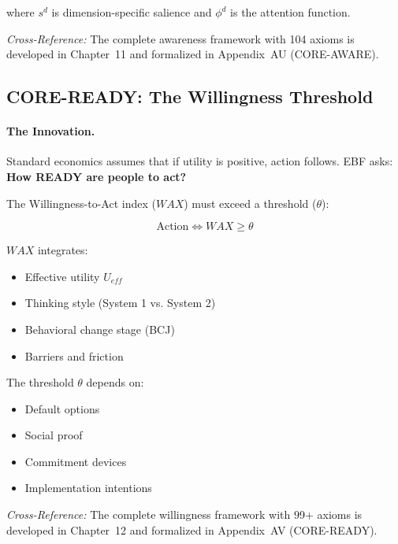 where $s^d$ is dimension-specific salience and $\phi^d$ is the attention function.

\textit{Cross-Reference:} The complete awareness framework with 104 axioms is
developed in Chapter~11 and formalized in Appendix~AU (CORE-AWARE).

\subsection{CORE-READY: The Willingness Threshold}
\label{sec:10c-ready}

\paragraph{The Innovation.}
Standard economics assumes that if utility is positive, action follows.
EBF asks: \textbf{How READY are people to act?}

The Willingness-to-Act index ($WAX$) must exceed a threshold ($\theta$):

\begin{equation}
\boxed{\text{Action} \Leftrightarrow WAX \geq \theta}
\end{equation}

$WAX$ integrates:
\begin{itemize}[nosep]
\item Effective utility $U_{eff}$
\item Thinking style (System 1 vs. System 2)
\item Behavioral change stage (BCJ)
\item Barriers and friction
\end{itemize}

The threshold $\theta$ depends on:
\begin{itemize}[nosep]
\item Default options
\item Social proof
\item Commitment devices
\item Implementation intentions
\end{itemize}

\textit{Cross-Reference:} The complete willingness framework with 99+ axioms is
developed in Chapter~12 and formalized in Appendix~AV (CORE-READY).

